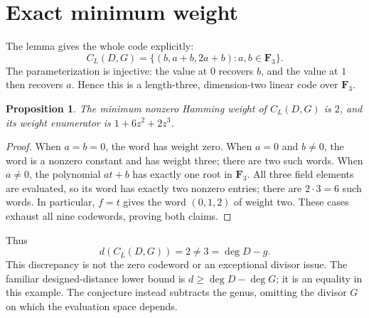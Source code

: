 \documentclass[11pt,a4paper]{article}
\newtheorem{proposition}{Proposition}
\begin{document}
\section{Exact minimum weight}
The lemma gives the whole code explicitly:
\[
 C_L(D,G)=\{(b,a+b,2a+b):a,b\in\mathbf F_3\}.
\]
The parameterization is injective: the value at $0$ recovers $b$, and
the value at $1$ then recovers $a$. Hence this is a length-three,
dimension-two linear code over $\mathbf F_3$.

\begin{proposition}
The minimum nonzero Hamming weight of $C_L(D,G)$ is $2$, and its
weight enumerator is $1+6z^2+2z^3$.
\end{proposition}
\begin{proof}
When $a=b=0$, the word has weight zero. When $a=0$ and $b\ne0$,
the word is a nonzero constant and has weight three; there are two such
words. When $a\ne0$, the polynomial $at+b$ has exactly one root in
$\mathbf F_3$. All three field elements are evaluated, so its word has
exactly two nonzero entries; there are $2\cdot3=6$ such words.
In particular, $f=t$ gives the word $(0,1,2)$ of weight two. These cases
exhaust all nine codewords, proving both claims.
\end{proof}

Thus
\[
 \boxed{d(C_L(D,G))=2\ne3=\deg D-g.}
\]
This discrepancy is not the zero codeword or an exceptional divisor issue.
The familiar designed-distance lower bound is $d\geq\deg D-\deg G$;
it is an equality in this example. The conjecture instead subtracts the
genus, omitting the divisor $G$ on which the evaluation space depends.
\end{document}
